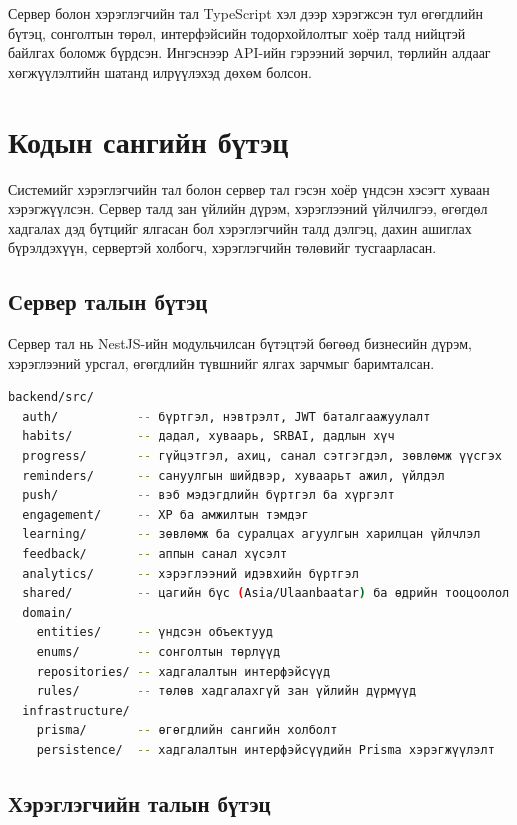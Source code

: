 Сервер болон хэрэглэгчийн тал TypeScript хэл дээр хэрэгжсэн тул өгөгдлийн бүтэц, сонголтын төрөл, интерфэйсийн тодорхойлолтыг хоёр талд нийцтэй байлгах боломж бүрдсэн. Ингэснээр API-ийн гэрээний зөрчил, төрлийн алдааг хөгжүүлэлтийн шатанд илрүүлэхэд дөхөм болсон.

\section{Кодын сангийн бүтэц}

Системийг хэрэглэгчийн тал болон сервер тал гэсэн хоёр үндсэн хэсэгт хуваан хэрэгжүүлсэн. Сервер талд зан үйлийн дүрэм, хэрэглээний үйлчилгээ, өгөгдөл хадгалах дэд бүтцийг ялгасан бол хэрэглэгчийн талд дэлгэц, дахин ашиглах бүрэлдэхүүн, сервертэй холбогч, хэрэглэгчийн төлөвийг тусгаарласан.

\subsection{Сервер талын бүтэц}

Сервер тал нь NestJS-ийн модульчилсан бүтэцтэй бөгөөд бизнесийн дүрэм, хэрэглээний урсгал, өгөгдлийн түвшнийг ялгах зарчмыг баримталсан.

\begin{lstlisting}[language=bash, caption={Сервер талын директорийн бүтэц}]
backend/src/
  auth/           -- бүртгэл, нэвтрэлт, JWT баталгаажуулалт
  habits/         -- дадал, хуваарь, SRBAI, дадлын хүч
  progress/       -- гүйцэтгэл, ахиц, санал сэтгэгдэл, зөвлөмж үүсгэх
  reminders/      -- сануулгын шийдвэр, хуваарьт ажил, үйлдэл
  push/           -- вэб мэдэгдлийн бүртгэл ба хүргэлт
  engagement/     -- XP ба амжилтын тэмдэг
  learning/       -- зөвлөмж ба суралцах агуулгын харилцан үйлчлэл
  feedback/       -- аппын санал хүсэлт
  analytics/      -- хэрэглээний идэвхийн бүртгэл
  shared/         -- цагийн бүс (Asia/Ulaanbaatar) ба өдрийн тооцоолол
  domain/
    entities/     -- үндсэн объектууд
    enums/        -- сонголтын төрлүүд
    repositories/ -- хадгалалтын интерфэйсүүд
    rules/        -- төлөв хадгалахгүй зан үйлийн дүрмүүд
  infrastructure/
    prisma/       -- өгөгдлийн сангийн холболт
    persistence/  -- хадгалалтын интерфэйсүүдийн Prisma хэрэгжүүлэлт
\end{lstlisting}

\subsection{Хэрэглэгчийн талын бүтэц}

